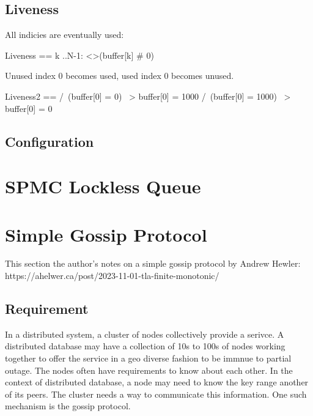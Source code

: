 \documentclass{report}
\begin{document}
\section{Liveness}

All indicies are eventually used:

\begin{tla}
    Liveness ==
    \A k ..N-1:
    <>(buffer[k] # 0)
\end{tla}
\begin{tlatex}
%
%
%
\end{tlatex}

Unused index 0 becomes used, used index 0 becomes unused.
\begin{tla}
    Liveness2 ==
    /\ (buffer[0] = 0) ~> buffer[0] = 1000
    /\ (buffer[0] = 1000) ~> buffer[0] = 0
\end{tla}
\begin{tlatex}
%
\end{tlatex}

\section{Configuration}

\chapter{SPMC Lockless Queue}

\chapter{Simple Gossip Protocol}

This section the author's notes on a simple gossip protocol by Andrew Hewler:\newline
https://ahelwer.ca/post/2023-11-01-tla-finite-monotonic/\newline

\section{Requirement}

In a distributed system, a cluster of nodes collectively provide a serivce. A
distributed database may have a collection of 10s to 100s of nodes working
together to offer the service in a geo diverse fashion to be immnue to partial
outage.  The nodes often have requirements to know about each other. In the
context of distributed database, a node may need to know the key range another
of its peers. The cluster needs a way to communicate this information. One such
mechanism is the gossip protocol.
\end{document}
